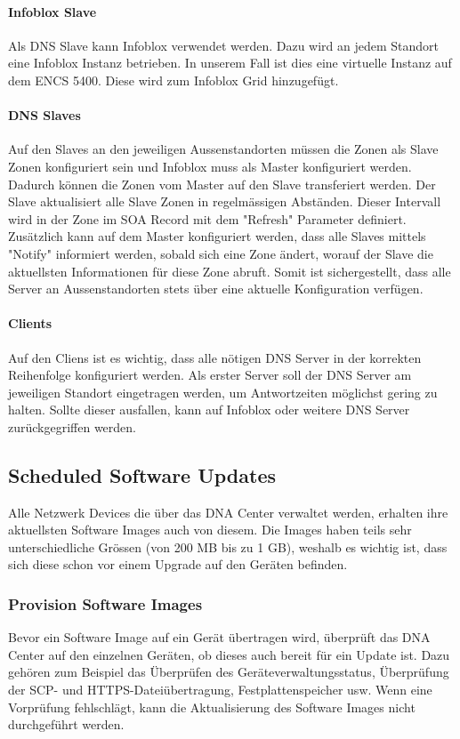 \paragraph{Infoblox Slave}

Als DNS Slave kann Infoblox verwendet werden. Dazu wird an jedem Standort eine Infoblox Instanz betrieben. In unserem Fall ist dies eine virtuelle Instanz auf dem ENCS 5400. Diese wird zum Infoblox Grid hinzugefügt.

\paragraph{DNS Slaves}

Auf den Slaves an den jeweiligen Aussenstandorten müssen die Zonen als Slave Zonen konfiguriert sein und Infoblox muss als Master konfiguriert werden. Dadurch können die Zonen vom Master auf den Slave transferiert werden. Der Slave aktualisiert alle Slave Zonen in regelmässigen Abständen. Dieser Intervall wird in der Zone im SOA Record mit dem "Refresh" Parameter definiert.
Zusätzlich kann auf dem Master konfiguriert werden, dass alle Slaves mittels "Notify" informiert werden, sobald sich eine Zone ändert, worauf der Slave die aktuellsten Informationen für diese Zone abruft. Somit ist sichergestellt, dass alle Server an Aussenstandorten stets über eine aktuelle Konfiguration verfügen.

\paragraph{Clients}

Auf den Cliens ist es wichtig, dass alle nötigen DNS Server in der korrekten Reihenfolge konfiguriert werden. Als erster Server soll der DNS Server am jeweiligen Standort eingetragen werden, um Antwortzeiten möglichst gering zu halten. Sollte dieser ausfallen, kann auf Infoblox oder weitere DNS Server zurückgegriffen werden.


\subsection{Scheduled Software Updates}
Alle Netzwerk Devices die über das DNA Center verwaltet werden, erhalten ihre aktuellsten Software Images auch von diesem. Die Images haben teils sehr unterschiedliche Grössen (von 200 MB bis zu 1 GB), weshalb es wichtig ist, dass sich diese schon vor einem Upgrade auf den Geräten befinden. 


\subsubsection{Provision Software Images}
Bevor ein Software Image auf ein Gerät übertragen wird, überprüft das DNA Center auf den einzelnen Geräten, ob dieses auch bereit für ein Update ist. Dazu gehören zum Beispiel das Überprüfen des Geräteverwaltungsstatus, Überprüfung der SCP- und HTTPS-Dateiübertragung, Festplattenspeicher usw. Wenn eine Vorprüfung fehlschlägt, kann die Aktualisierung des Software Images nicht durchgeführt werden. \\

